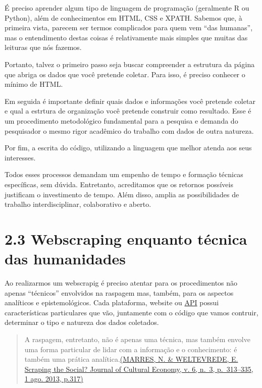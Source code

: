 \documentclass[
]{book}
\begin{document}
É preciso aprender algum tipo de linguagem de programação (geralmente R ou Python), além de conhecimentos em HTML, CSS e XPATH. Sabemos que, à primeira vista, parecem ser termos complicados para quem vem ``das humanas'', mas o entendimento destas coisas é relativamente mais simples que muitas das leituras que nós fazemos.

Portanto, talvez o primeiro passo seja buscar compreender a estrutura da página que abriga os dados que você pretende coletar. Para isso, é preciso conhecer o mínimo de HTML.

Em seguida é importante definir quais dados e informações você pretende coletar e qual a estrtura de organização você pretende construir como resultado. Esse é um procedimento metodológico fundamental para a pesquisa e demanda do pesquisador o mesmo rigor acadêmico do trabalho com dados de outra natureza.

Por fim, a escrita do código, utilizando a linguagem que melhor atenda aos seus interesses.

Todos esses processos demandam um empenho de tempo e formação técnicas específicas, sem dúvida. Entretanto, acreditamos que os retornos possíveis justificam o investimento de tempo. Além disso, amplia as possibilidades de trabalho interdisciplinar, colaborativo e aberto.

\hypertarget{webscraping-enquanto-tuxe9cnica-das-humanidades}{%
\section{2.3 Webscraping enquanto técnica das humanidades}\label{webscraping-enquanto-tuxe9cnica-das-humanidades}}

Ao realizarmos um webscrapig é preciso atentar para os procedimentos não apenas ``técnicos'' envolvidos na raspagem mas, também, para os aspectos analíticos e epistemológicos. Cada plataforma, website ou \href{https://canaltech.com.br/software/o-que-e-api/}{API} possui características particulares que vão, juntamente com o código que vamos contruir, determinar o tipo e natureza dos dados coletados.

\begin{quote}
A raspagem, entretanto, não é apenas uma técnica, mas também envolve uma forma particular de lidar com a informação e o conhecimento: é também uma prática analítica.\href{https://www.tandfonline.com/doi/abs/10.1080/17530350.2013.772070}{(MARRES, N. \& WELTEVREDE, E. Scraping the Social? Journal of Cultural Economy, v. 6, n.~3, p.~313--335, 1 ago. 2013, p.317)}
\end{quote}
\end{document}
